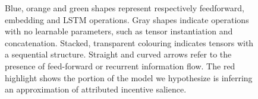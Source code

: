 \begin{figure}[ht]
\begin{center}
\begin{adjustbox}{width=0.5\textwidth}
\begin{tikzpicture}[x=0.75pt,y=0.75pt,yscale=-1,xscale=1]
\end{tikzpicture}

\end{adjustbox}
\end{center}
\caption[\textbf{Bifurcating Model Architecture}]{Blue, orange and green shapes represent respectively feedforward, embedding and LSTM operations. Gray shapes indicate operations with no learnable parameters, such as tensor instantiation and concatenation. Stacked, transparent colouring indicates tensors with a sequential structure. Straight and curved arrows refer to the presence of feed-forward or recurrent information flow. The red highlight shows the portion of the model we hypothesize is inferring an approximation of attributed incentive salience.}
\label{fig: rnn_1}
\end{figure}